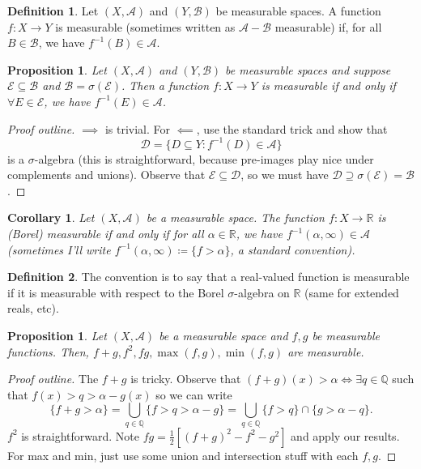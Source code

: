 \documentclass[letterpaper,12pt]{article}
\theoremstyle{definition}
\newtheorem{definition}{Definition}[section]
\theoremstyle{plain}
\newtheorem{proposition}[thm]{Proposition}
\newtheorem{corollary}[thm]{Corollary}
\theoremstyle{remark}
\newcommand{\R}{\mathbb{R}}
\newcommand{\Q}{\mathbb{Q}}
\begin{document}
\begin{definition}
Let $(X,\mathcal{A})$ and $(Y,\mathcal{B})$ be measurable spaces. A function $f:X\to Y$ is measurable (sometimes written as $\mathcal{A}-\mathcal{B}$ measurable) if, for all $B\in \mathcal{B}$, we have $f^{-1}(B)\in \mathcal{A}$.
\end{definition}


\begin{proposition}
Let $(X,\mathcal{A})$ and $(Y,\mathcal{B})$ be measurable spaces and suppose $\mathcal{E}\subseteq \mathcal{B}$ and $\mathcal{B} = \sigma(\mathcal{E})$. Then a function $f:X\to Y$ is measurable if and only if $\forall E\in \mathcal{E}$, we have $f^{-1}(E) \in \mathcal{A}$.
\end{proposition}

\begin{proof}[Proof outline]
$\implies$ is trivial. For $\impliedby$, use the standard trick and show that
\[\mathcal{D} = \{D\subseteq Y:f^{-1}(D)\in \mathcal{A}\}\]
is a $\sigma$-algebra (this is straightforward, because pre-images play nice under complements and unions). Observe that $\mathcal{E}\subseteq \mathcal{D}$, so we must have $\mathcal{D}\supseteq \sigma(\mathcal{E}) = \mathcal{B}$. 
\end{proof}

\begin{corollary}
Let $(X,\mathcal{A})$ be a measurable space. The function $f:X\to \R$ is (Borel) measurable if and only if for all $\alpha\in\R$, we have $f^{-1}(\alpha,\infty)\in \mathcal{A}$ (sometimes I'll write $f^{-1}(\alpha,\infty) \coloneqq \{f>\alpha\}$, a standard convention).
\end{corollary}

\begin{definition}
The convention is to say that a real-valued function is measurable if it is measurable with respect to the Borel $\sigma$-algebra on $\R$ (same for extended reals, etc).
\end{definition}

\begin{proposition}
Let $(X,\mathcal{A})$ be a measurable space and $f,g$ be measurable functions. Then, $f+g,f^2,fg,\max(f,g),\min(f,g)$ are measurable.
\end{proposition}

\begin{proof}[Proof outline]
The $f+g$ is tricky. Observe that $(f+g)(x)>\alpha\iff \exists q\in \mathbb{Q}$ such that $f(x)>q>\alpha-g(x)$ so we can write
\[\{f+g>\alpha\} = \bigcup_{q\in \mathbb{Q}}\{f>q>\alpha-g\} = \bigcup_{q\in \Q} \{f>q\}\cap \{g>\alpha-q\}.\]
$f^2$ is straightforward. Note $fg = \frac{1}{2}[(f+g)^2-f^2-g^2]$ and apply our results. For max and min, just use some union and intersection stuff with each $f,g$.
\end{proof}
\end{document}
